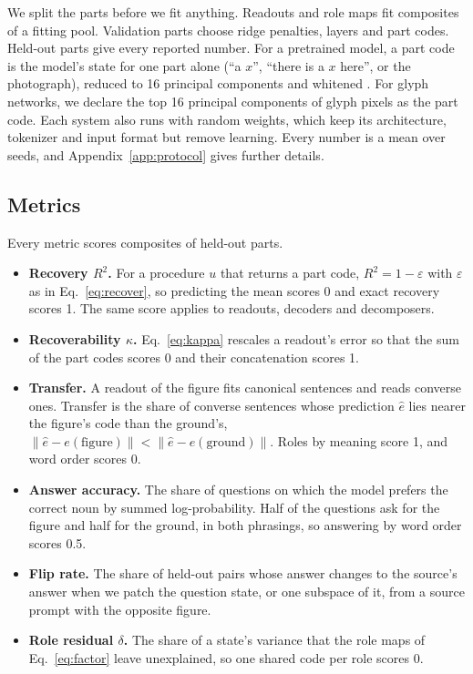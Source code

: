 We split the parts before we fit anything. Readouts and role maps fit composites of a fitting pool. Validation parts choose ridge penalties, layers and part codes. Held-out parts give every reported number. For a pretrained model, a part code is the model's state for one part alone (``a $x$'', ``there is a $x$ here'', or the photograph), reduced to 16 principal components and whitened \citep{timkey2021}. For glyph networks, we declare the top 16 principal components of glyph pixels as the part code. Each system also runs with random weights, which keep its architecture, tokenizer and input format but remove learning. Every number is a mean over seeds, and Appendix~\ref{app:protocol} gives further details.

\subsection{Metrics}

Every metric scores composites of held-out parts.
\begin{itemize}
  \item \textbf{Recovery $R^2$.} For a procedure $u$ that returns a part code, $R^2 = 1 - \varepsilon$ with $\varepsilon$ as in Eq.~\eqref{eq:recover}, so predicting the mean scores 0 and exact recovery scores 1. The same score applies to readouts, decoders and decomposers.
  \item \textbf{Recoverability $\kappa$.} Eq.~\eqref{eq:kappa} rescales a readout's error so that the sum of the part codes scores 0 and their concatenation scores 1.
  \item \textbf{Transfer.} A readout of the figure fits canonical sentences and reads converse ones. Transfer is the share of converse sentences whose prediction $\hat{e}$ lies nearer the figure's code than the ground's, $\lVert \hat{e} - e(\text{figure}) \rVert < \lVert \hat{e} - e(\text{ground}) \rVert$. Roles by meaning score 1, and word order scores 0.
  \item \textbf{Answer accuracy.} The share of questions on which the model prefers the correct noun by summed log-probability. Half of the questions ask for the figure and half for the ground, in both phrasings, so answering by word order scores 0.5.
  \item \textbf{Flip rate.} The share of held-out pairs whose answer changes to the source's answer when we patch the question state, or one subspace of it, from a source prompt with the opposite figure.
  \item \textbf{Role residual $\delta$.} The share of a state's variance that the role maps of Eq.~\eqref{eq:factor} leave unexplained, so one shared code per role scores 0.
\end{itemize}

